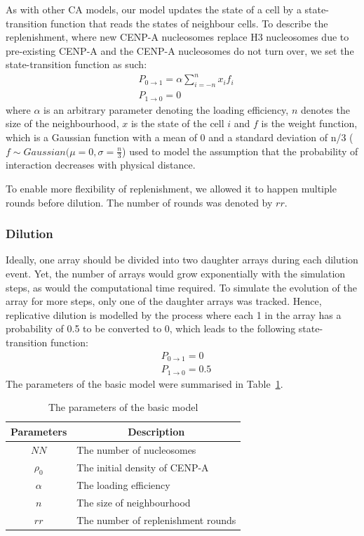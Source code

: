 As with other CA models, our model updates the state of a cell by a state-transition function that reads the states of neighbour cells. To describe the replenishment, where new CENP-A nucleosomes replace H3 nucleosomes due to pre-existing CENP-A and the CENP-A nucleosomes do not turn over, we set the state-transition function as such: 
\begin{align*}
    & P_{0\rightarrow 1}=\alpha\sum_{i=-n}^{n} x_if_i \\
    & P_{1\rightarrow 0}=0 
\end{align*}
where $\alpha$ is an arbitrary parameter denoting the loading efficiency, $n$ denotes the size of the neighbourhood, $x$ is the state of the cell $i$ and $f$ is the weight function, which is a Gaussian function with a mean of 0 and a standard deviation of n/3 ($f\sim Gaussian(\mu=0, \sigma=\frac{n}{3}$) used to model the assumption that the probability of interaction decreases with physical distance. 

To enable more flexibility of replenishment, we allowed it to happen multiple rounds before dilution. The number of rounds was denoted by $rr$. 

\subsubsection{Dilution}

Ideally, one array should be divided into two daughter arrays during each dilution event. Yet, the number of arrays would grow exponentially with the simulation steps, as would the computational time required. To simulate the evolution of the array for more steps, only one of the daughter arrays was tracked. Hence, replicative dilution is modelled by the process where each 1 in the array has a probability of 0.5 to be converted to 0, which leads to the following state-transition function: 
\begin{align*}
    & P_{0\rightarrow 1}=0 \\
    & P_{1\rightarrow 0}=0.5
\end{align*}
The parameters of the basic model were summarised in Table~\ref{tab:parameters}. \\

\begin{table}[htbp]
\centering
\caption{The parameters of the basic model}
\label{tab:parameters}
\begin{tabular}{cl}
\hline
\textbf{Parameters} & \multicolumn{1}{c}{\textbf{Description}} \\ \hline
$NN$                  & The number of nucleosomes                \\
$\rho_{0}$               & The initial density of CENP-A            \\
$\alpha$               & The  loading efficiency                  \\
$n$                   & The size of neighbourhood                \\
$rr$                  & The number of replenishment rounds      \\ \hline
\end{tabular}
\end{table}

